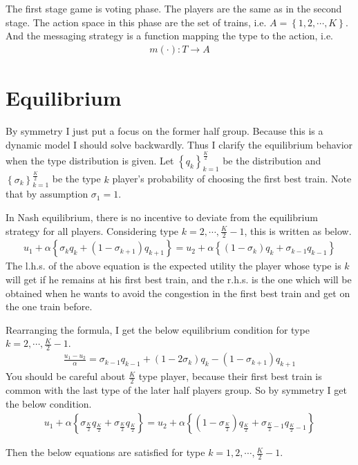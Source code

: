 \documentclass{article}
\begin{document}
The first stage game is voting phase. The players are the same as in the second stage. The action space in this phase are the set of trains, i.e. $A = \left\{ 1,2,\cdots, K \right\}$. And the messaging strategy is a function mapping the type to the action, i.e.
\begin{align*}
	m(\cdot) : T \to A
\end{align*}

\section{Equilibrium}
By symmetry I just put a focus on the former half group. Because this is a dynamic model I should solve backwardly. Thus I clarify the equilibrium behavior when the type distribution is given. Let $\left\{ q_k \right\}_{k = 1}^{\frac{K}{2}}$ be the distribution and $\left\{ \sigma_k \right\}_{k = 1}^{\frac{K}{2}}$ be the type $k$ player's probability of choosing the first best train. Note that by assumption $\sigma_1 = 1$. 

In Nash equilibrium, there is no incentive to deviate from the equilibrium strategy for all players. Considering type $k = 2, \cdots, \frac{K}{2} -1$, this is written as below.
\begin{align*}
	u_1 + \alpha \left\{ \sigma_k q_k + (1-\sigma_{k+1}) q_{k+1} \right\} = u_2 + \alpha \left\{ (1-\sigma_k) q_k + \sigma_{k-1} q_{k-1} \right\}
\end{align*}
The l.h.s. of the above equation is the expected utility the player whose type is $k$ will get if he remains at his first best train, and the r.h.s. is the one which will be obtained when he wants to avoid the congestion in the first best train and get on the one train before.

Rearranging the formula, I get the below equilibrium condition for type $k = 2, \cdots, \frac{K}{2} -1$.
\begin{align*}
	\frac{u_1 - u_2}{\alpha} = \sigma_{k-1} q_{k-1} + (1 - 2 \sigma_{k}) q_k - (1-\sigma_{k+1}) q_{k + 1}
\end{align*}
You should be careful about $\frac{K}{2}$ type player, because their first best train is common with the last type of the later half players group. So by symmetry I get the below condition.
\begin{align*}
	u_1 + \alpha \left\{ \sigma_{\frac{K}{2}} q_{\frac{K}{2}} + \sigma_{\frac{K}{2}} q_{\frac{K}{2}} \right\} = u_2 + \alpha \left\{ (1-\sigma_{\frac{K}{2}}) q_{\frac{K}{2}} + \sigma_{\frac{K}{2}-1} q_{\frac{K}{2}-1} \right\}
\end{align*}


Then the below equations are satisfied for type $k = 1, 2, \cdots, \frac{K}{2} -1$.
\end{document}

